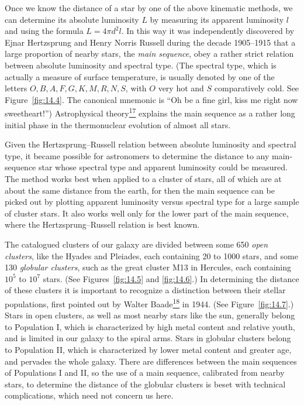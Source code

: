 Once we know the distance of a star by one of the above kinematic methods, we
can determine its absolute luminosity \(L\) by measuring its apparent
luminosity \(l\) and using the formula \(L=4\pi d^2l\). In this way it was
independently discovered by Ejnar Hertzsprung and Henry Norris Russell during
the decade 1905--1915 that a large proportion of nearby stars, the
\emph{main sequence}, obey a rather strict relation between absolute
luminosity and spectral type. (The spectral type, which is actually a
measure of surface temperature, is usually denoted by one of the letters
\(O,B,A,F,G,K,M,R,N,S\), with \(O\) very hot and \(S\) comparatively cold.
See Figure~\ref{fig:14.4}. The canonical mnemonic is ``Oh be a fine girl,
kiss me right now sweetheart!'') Astrophysical
theory\hyperref[ch14-ref-17]{\textsuperscript{17}} explains the main
sequence as a rather long initial phase in the thermonuclear evolution of
almost all stars.



Given the Hertzsprung--Russell relation between absolute luminosity and
spectral type, it became possible for astronomers to determine the distance
to any main-sequence star whose spectral type and apparent luminosity could
be measured. The method works best when applied to a cluster of stars, all
of which are at about the same distance from the earth, for then the main
sequence can be picked out by plotting apparent luminosity versus spectral
type for a large sample of cluster stars. It also works well only for the
lower part of the main sequence, where the Hertzsprung--Russell relation is
best known.

The catalogued clusters of our galaxy are divided between some 650
\emph{open clusters}, like the Hyades and Pleiades, each containing 20 to
1000 stars, and some 130 \emph{globular clusters}, such as the great cluster
M13 in Hercules, each containing \(10^5\) to \(10^7\) stars. (See
Figures~\ref{fig:14.5} and \ref{fig:14.6}.) In determining the distance of
these clusters it is important to recognize a distinction between their
stellar populations, first pointed out by Walter
Baade\hyperref[ch14-ref-18]{\textsuperscript{18}} in 1944. (See
Figure~\ref{fig:14.7}.) Stars in open clusters, as well as most nearby stars
like the sun, generally belong to Population I, which is characterized by
high metal content and relative youth, and is limited in our galaxy to the
spiral arms. Stars in globular clusters belong to Population II, which is
characterized by lower metal content and greater age, and pervades the whole
galaxy. There are differences between the main sequences of Populations I
and II, so the use of a main sequence, calibrated from nearby stars, to
determine the distance of the globular clusters is beset with technical
complications, which need not concern us here.

